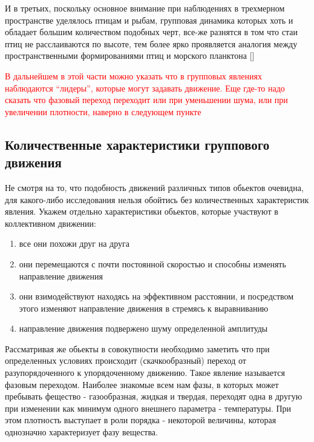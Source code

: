 	И в третьих, поскольку основное внимание при наблюдениях в трехмерном пространстве уделялось птицам и рыбам, групповая динамика которых хоть и обладает большим количеством подобных черт, все-же разнятся в том что стаи птиц не расслаиваются по высоте, тем более ярко проявляется аналогия между пространственными формированиями птиц и морского планктона []
	
            \textcolor{red}{В дальнейшем в этой части можно указать что в групповых явлениях наблюдаются ``лидеры'', которые могут задавать движение. Еще где-то надо сказать что фазовый переход переходит или при уменьшении шума, или при увеличении плотности, наверно в следующем пункте}


            \subsection{Количественные характеристики группового движения} %
            \label{sub:NumCharCollMot}
                Не смотря на то, что подобность движений различных типов обьектов очевидна, для какого-либо исследования нельзя обойтись без количественных характеристик явления.
                Укажем отдельно характеристики обьектов, которые участвуют в коллективном движении:
                \begin{enumerate}
                    \item все они похожи друг на друга
                    \item они перемещаются с почти постоянной скоростью и способны изменять направление движения
                    \item они взимодействуют находясь на эффективном расстоянии, и посредством этого изменяют направление движения в стремясь к выравниванию
                    \item направление движения подвержено шуму определенной амплитуды
                \end{enumerate}

            Рассматривая же обьекты в совокупности необходимо заметить что при определенных условиях происходит (скачкообразный) переход от разупорядоченного к упорядоченному движению. Такое явление называется фазовым переходом. Наиболее знакомые всем нам фазы, в которых может пребывать фещество - газообразная, жидкая и твердая, переходят одна в другую при изменении как минимум одного внешнего параметра - температуры. При этом плотность выступает в роли { порядка} - некоторой величины, которая однозначно характеризует фазу вещества.

